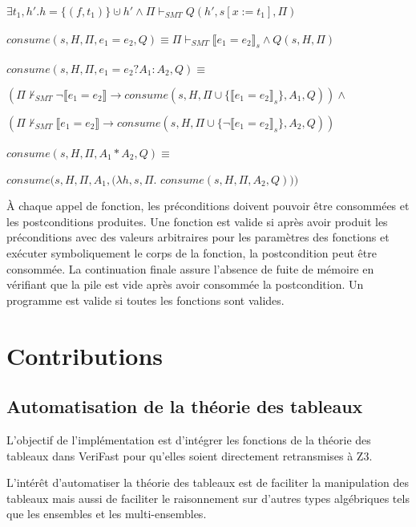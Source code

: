 \documentclass[11pt,openany]{article}
\newcommand{\verifast}{VeriFast}
\begin{document}
	$\exists t_1,h'. h = \{(f,t_1)\}\cupdot h'\land \Pi\vdash_{SMT} Q(h',s[x:=t_1],\Pi)$\\ \\
		$consume(s,H,\Pi,e_1=e_2,Q)\equiv\Pi\vdash_{SMT}\llbracket e_1=e_2\rrbracket_s\land Q(s,H,\Pi)$\\ \\
		$consume(s,H,\Pi,e_1=e_2?A_1:A_2,Q)\equiv$ 
		
		$(\Pi\not\vdash_{SMT}\neg\llbracket e_1 = e_2\rrbracket\rightarrow consume(s,H,\Pi\cup\{\llbracket e_1 = e_2\rrbracket_s\},A_1,Q))\land$
		
		$(\Pi\not\vdash_{SMT}\llbracket e_1 = e_2\rrbracket\rightarrow consume(s,H,\Pi\cup\{\neg\llbracket e_1 = e_2\rrbracket_s\},A_2,Q))$\\ \\
		$consume(s,H,\Pi,A_1*A_2,Q)\equiv$
		
		$consume(s,H,\Pi,A_1,(\lambda h,s,\Pi.$ $consume(s,H,\Pi,A_2,Q)))$

	\`A chaque appel de fonction, les pr\'econditions doivent pouvoir \^etre consomm\'ees et les postconditions produites. Une fonction est valide si apr\`es avoir produit les pr\'econditions avec des valeurs arbitraires pour les param\`etres des fonctions et ex\'ecuter symboliquement le corps de la fonction, la postcondition peut \^etre consomm\'ee. La continuation finale assure l'absence de fuite de m\'emoire en v\'erifiant que la pile est vide apr\`es avoir consomm\'ee la postcondition. Un programme est valide si toutes les fonctions sont valides.
	
\section{Contributions}
	\subsection{Automatisation de la th\'eorie des tableaux}
	L'objectif de l'impl\'ementation est d'int\'egrer les fonctions de la th\'eorie des tableaux dans \verifast{} pour qu'elles soient directement retransmises \`a Z3.
	
	L'int\'er\^et d'automatiser la th\'eorie des tableaux est de faciliter la manipulation des tableaux mais aussi de faciliter le raisonnement sur d'autres types alg\'ebriques tels que les ensembles et les multi-ensembles.
	
\end{document}
